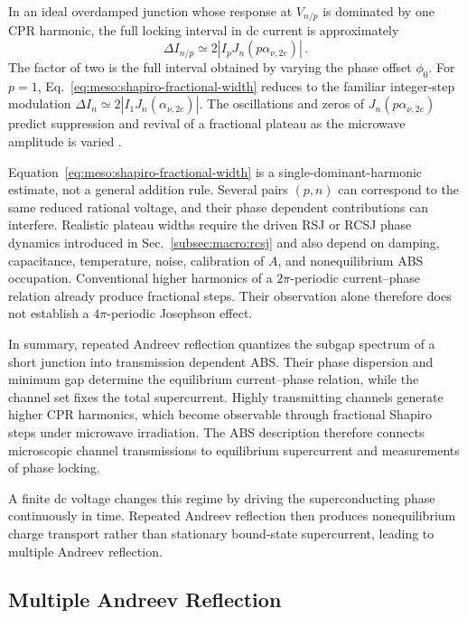             In an ideal overdamped junction whose response at $V_{n/p}$ is dominated by one CPR harmonic, the full locking interval in dc current is approximately
            \begin{equation}
                \Delta I_{n/p}\simeq2\left|I_pJ_n(p\alpha_{\nu,2e})\right|\,.
                \label{eq:meso:shapiro-fractional-width}
            \end{equation}
            The factor of two is the full interval obtained by varying the phase offset $\phi_0$. For $p=1$, Eq.~\eqref{eq:meso:shapiro-fractional-width} reduces to the familiar integer-step modulation $\Delta I_n\simeq2|I_1J_n(\alpha_{\nu,2e})|$. The oscillations and zeros of $J_n(p\alpha_{\nu,2e})$ predict suppression and revival of a fractional plateau as the microwave amplitude is varied \cite{duprat_phase_2005}.

            Equation~\eqref{eq:meso:shapiro-fractional-width} is a single-dominant-harmonic estimate, not a general addition rule. Several pairs $(p,n)$ can correspond to the same reduced rational voltage, and their phase dependent contributions can interfere. Realistic plateau widths require the driven RSJ or RCSJ phase dynamics introduced in Sec.~\ref{subsec:macro:rcsj} and also depend on damping, capacitance, temperature, noise, calibration of $A$, and nonequilibrium ABS occupation. Conventional higher harmonics of a $2\pi$-periodic current--phase relation already produce fractional steps. Their observation alone therefore does not establish a $4\pi$-periodic Josephson effect.

        In summary, repeated Andreev reflection quantizes the subgap spectrum of a short junction into transmission dependent ABS. Their phase dispersion and minimum gap determine the equilibrium current--phase relation, while the channel set fixes the total supercurrent. Highly transmitting channels generate higher CPR harmonics, which become observable through fractional Shapiro steps under microwave irradiation. The ABS description therefore connects microscopic channel transmissions to equilibrium supercurrent and measurements of phase locking.

        A finite dc voltage changes this regime by driving the superconducting phase continuously in time. Repeated Andreev reflection then produces nonequilibrium charge transport rather than stationary bound-state supercurrent, leading to multiple Andreev reflection.

    \subsection{Multiple Andreev Reflection}
    \label{subsec:meso:mar}

